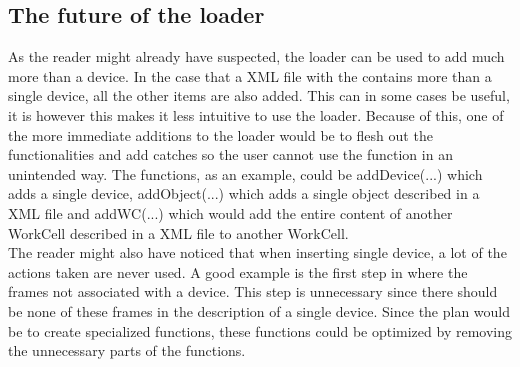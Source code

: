\subsection{The future of the loader}
As the reader might already have suspected, the loader can be used to add much more than a device. In the case that a XML file with the contains more than a single device, all the other items are also added. This can in some cases be useful, it is however this makes it less intuitive to use the loader. Because of this, one of the more immediate additions to the loader would be to flesh out the functionalities and add catches so the user cannot use the function in an unintended way. The functions, as an example, could be addDevice(...) which adds a single device, addObject(...) which adds a single object described in a XML file and addWC(...) which would add the entire content of another WorkCell described in a XML file to another WorkCell.\\
The reader might also have noticed that when inserting single device, a lot of the actions taken are never used. A good example is the first step in where the frames not associated with a device. This step is unnecessary since there should be none of these frames in the description of a single device. Since the plan would be to create specialized functions, these functions could be optimized by removing the unnecessary parts of the functions.
